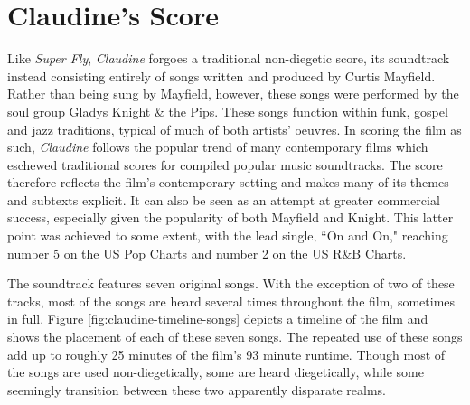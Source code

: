 \section{Claudine's Score}

Like \textit{Super Fly}, \textit{Claudine} forgoes a traditional non-diegetic score, its soundtrack instead consisting entirely of songs written and produced by Curtis Mayfield.
Rather than being sung by Mayfield, however, these songs were performed by the soul group Gladys Knight \& the Pips.
These songs function within funk, gospel and jazz traditions, typical of much of both artists' oeuvres.
In scoring the film as such, \textit{Claudine} follows the popular trend of many contemporary films which eschewed traditional scores for compiled popular music soundtracks.
The score therefore reflects the film's contemporary setting and makes many of its themes and subtexts explicit.
It can also be seen as an attempt at greater commercial success, especially given the popularity of both Mayfield and Knight.
This latter point was achieved to some extent, with the lead single, ``On and On," reaching number 5 on the US Pop Charts and number 2 on the US R\&B Charts. 

The soundtrack features seven original songs.
With the exception of two of these tracks, most of the songs are heard several times throughout the film, sometimes in full.
Figure \ref{fig:claudine-timeline-songs} depicts a timeline of the film and shows the placement of each of these seven songs.
The repeated use of these songs add up to roughly 25 minutes of the film's 93 minute runtime.
Though most of the songs are used non-diegetically, some are heard diegetically, while some seemingly transition between these two apparently disparate realms.


